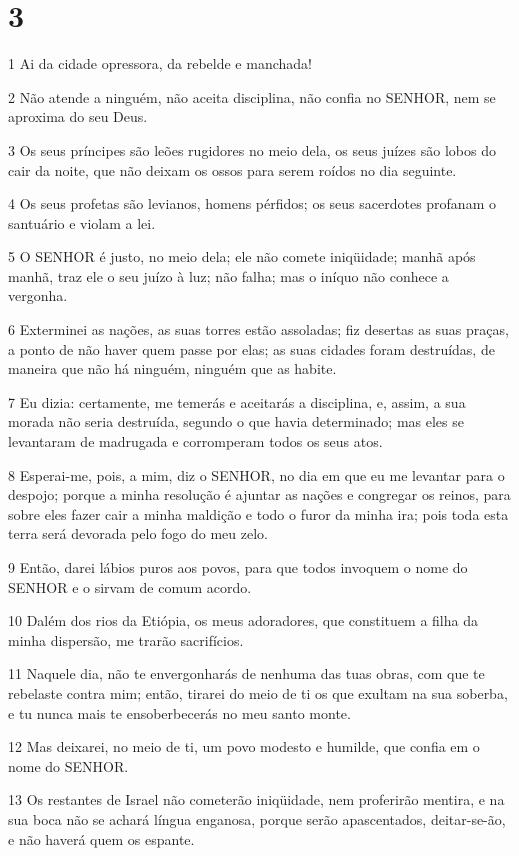 \chapter{3}

\par 1 Ai da cidade opressora, da rebelde e manchada!
\par 2 Não atende a ninguém, não aceita disciplina, não confia no SENHOR, nem se aproxima do seu Deus.
\par 3 Os seus príncipes são leões rugidores no meio dela, os seus juízes são lobos do cair da noite, que não deixam os ossos para serem roídos no dia seguinte.
\par 4 Os seus profetas são levianos, homens pérfidos; os seus sacerdotes profanam o santuário e violam a lei.
\par 5 O SENHOR é justo, no meio dela; ele não comete iniqüidade; manhã após manhã, traz ele o seu juízo à luz; não falha; mas o iníquo não conhece a vergonha.
\par 6 Exterminei as nações, as suas torres estão assoladas; fiz desertas as suas praças, a ponto de não haver quem passe por elas; as suas cidades foram destruídas, de maneira que não há ninguém, ninguém que as habite.
\par 7 Eu dizia: certamente, me temerás e aceitarás a disciplina, e, assim, a sua morada não seria destruída, segundo o que havia determinado; mas eles se levantaram de madrugada e corromperam todos os seus atos.
\par 8 Esperai-me, pois, a mim, diz o SENHOR, no dia em que eu me levantar para o despojo; porque a minha resolução é ajuntar as nações e congregar os reinos, para sobre eles fazer cair a minha maldição e todo o furor da minha ira; pois toda esta terra será devorada pelo fogo do meu zelo.
\par 9 Então, darei lábios puros aos povos, para que todos invoquem o nome do SENHOR e o sirvam de comum acordo.
\par 10 Dalém dos rios da Etiópia, os meus adoradores, que constituem a filha da minha dispersão, me trarão sacrifícios.
\par 11 Naquele dia, não te envergonharás de nenhuma das tuas obras, com que te rebelaste contra mim; então, tirarei do meio de ti os que exultam na sua soberba, e tu nunca mais te ensoberbecerás no meu santo monte.
\par 12 Mas deixarei, no meio de ti, um povo modesto e humilde, que confia em o nome do SENHOR.
\par 13 Os restantes de Israel não cometerão iniqüidade, nem proferirão mentira, e na sua boca não se achará língua enganosa, porque serão apascentados, deitar-se-ão, e não haverá quem os espante.
